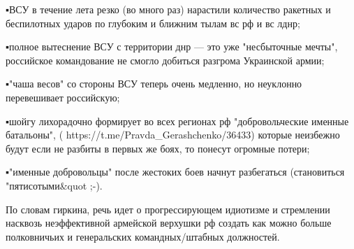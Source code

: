 ▪️ВСУ в течение лета резко (во много раз) нарастили количество ракетных и
беспилотных ударов по глубоким и ближним тылам вс рф и вс лднр;

 ▪️полное вытеснение ВСУ с территории днр — это уже "несбыточные мечты",
 российское командование не смогло добиться разгрома Украинской армии;

▪️"чаша весов" со стороны ВСУ теперь очень медленно, но неуклонно перевешивает российскую;

 ▪️шойгу лихорадочно формирует во всех регионах рф "добровольческие именные батальоны", (
https://t.me/Pravda_Gerashchenko/36433) которые неизбежно будут если не разбиты в первых же боях, то понесут огромные потери;

 ▪️"именные добровольцы" после жестоких боев начнут разбегаться (становиться
 "пятисотыми&quot ;-).

По словам гиркина, речь идет о прогрессирующем идиотизме и стремлении насквозь
неэффективной армейской верхушки рф создать как можно больше полковничьих и
генеральских командных/штабных должностей.


